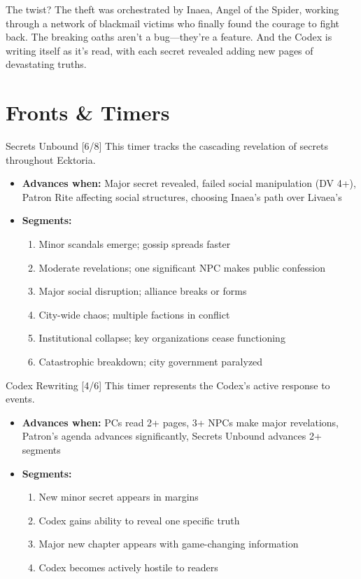 \documentclass[11pt]{article}
\begin{document}
The twist? The theft was orchestrated by Inaea, Angel of the Spider, working through a network of blackmail victims who finally found the courage to fight back. The breaking oaths aren't a bug---they're a feature. And the Codex is writing itself as it's read, with each secret revealed adding new pages of devastating truths.

\section*{Fronts \& Timers}

\begin{mechanicsbox}{Secrets Unbound [6/8]}
This timer tracks the cascading revelation of secrets throughout Ecktoria.
\begin{itemize}
    \item \textbf{Advances when:} Major secret revealed, failed social manipulation (DV 4+), Patron Rite affecting social structures, choosing Inaea's path over Livaea's
    \item \textbf{Segments:}
    \begin{enumerate}
        \item Minor scandals emerge; gossip spreads faster
        \item Moderate revelations; one significant NPC makes public confession
        \item Major social disruption; alliance breaks or forms
        \item City-wide chaos; multiple factions in conflict
        \item Institutional collapse; key organizations cease functioning
        \item Catastrophic breakdown; city government paralyzed
    \end{enumerate}
\end{itemize}
\end{mechanicsbox}

\begin{mechanicsbox}{Codex Rewriting [4/6]}
This timer represents the Codex's active response to events.
\begin{itemize}
    \item \textbf{Advances when:} PCs read 2+ pages, 3+ NPCs make major revelations, Patron's agenda advances significantly, Secrets Unbound advances 2+ segments
    \item \textbf{Segments:}
    \begin{enumerate}
        \item New minor secret appears in margins
        \item Codex gains ability to reveal one specific truth
        \item Major new chapter appears with game-changing information
        \item Codex becomes actively hostile to readers
    \end{enumerate}
\end{itemize}
\end{mechanicsbox}
\end{document}
